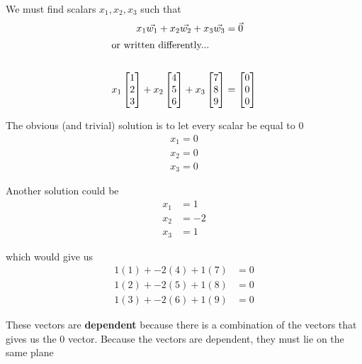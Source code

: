 \documentclass[12pt]{article}
\begin{document}
We must find scalars $ x_1, x_2, x_3 $ such that
\begin{align*}
  x_1 \vec{w_1} + x_2 \vec{w_2} + x_3 \vec{w_3} &= \vec{0}\\ 
  \intertext{or written differently...}\\
  x_1 \begin{bmatrix}
  1\\
  2\\
  3
  \end{bmatrix} +
  x_2 \begin{bmatrix}
  4\\
  5\\
  6
  \end{bmatrix} + 
  x_3 \begin{bmatrix}
  7\\
  8\\
  9
\end{bmatrix} &=
  \begin{bmatrix}
  0\\
  0\\
  0
  \end{bmatrix}
\end{align*}

The obvious (and trivial) solution is to let every scalar be equal to 0
\begin{align*}
  x_1=0\\
  x_2=0\\
  x_3=0
\end{align*}

Another solution could be
\begin{align*}
  x_1 &= 1\\
  x_2 &= -2\\
  x_3 &= 1
\end{align*}

which would give us
\begin{align*}
  1(1) + -2(4) + 1(7) &= 0\\
  1(2) + -2(5) + 1(8) &= 0\\
  1(3) + -2(6) + 1(9) &= 0
\end{align*}

These vectors are \textbf{dependent} because there is a combination of the vectors that gives us the 0 vector.
Because the vectors are dependent, they must lie on the same plane
\end{document}

